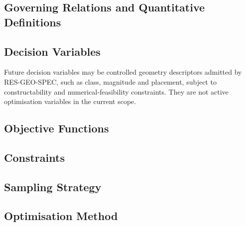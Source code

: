 \subsection{Governing Relations and Quantitative Definitions}
\label{sec:res-opt-prb-governing-relations}

%

\subsection{Decision Variables}
\label{sec:res-opt-prb-decision-variables}

Future decision variables may be controlled geometry descriptors
admitted by RES-GEO-SPEC, such as class, magnitude and placement,
subject to constructability and numerical-feasibility constraints.
They are not active optimisation variables in the current scope.

\subsection{Objective Functions}
\label{sec:res-opt-prb-objective-functions}


\subsection{Constraints}
\label{sec:res-opt-prb-constraints}


\subsection{Sampling Strategy}
\label{sec:res-opt-prb-sampling-strategy}


\subsection{Optimisation Method}
\label{sec:res-opt-prb-optimisation-method}


